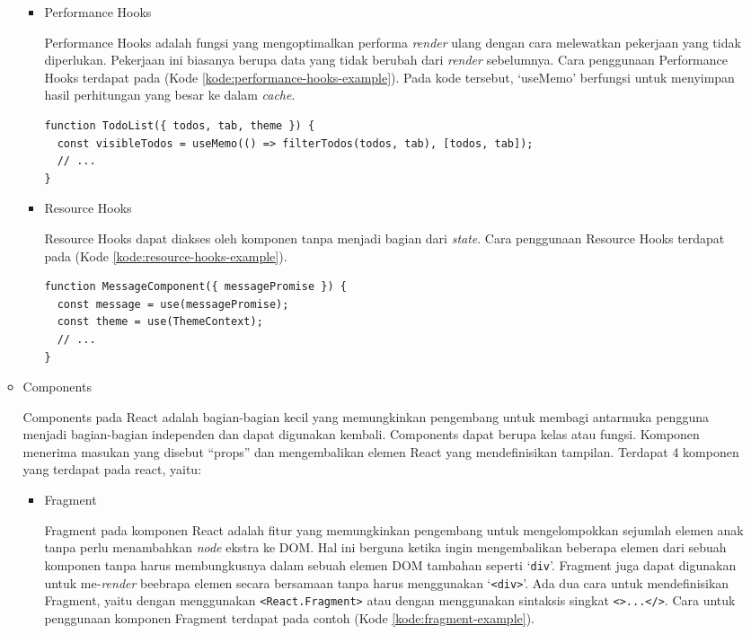\documentclass[a4paper,twoside]{article}
\begin{document}
\begin{enumerate}
\begin{itemize}
\begin{itemize}
        \item Performance Hooks

        Performance Hooks adalah fungsi yang mengoptimalkan performa \textit{render} ulang dengan cara melewatkan pekerjaan yang tidak diperlukan. Pekerjaan ini biasanya berupa data yang tidak berubah dari \textit{render} sebelumnya. Cara penggunaan Performance Hooks terdapat pada (Kode \ref{kode:performance-hooks-example}). Pada kode tersebut, `useMemo' berfungsi untuk menyimpan hasil perhitungan yang besar ke dalam \textit{cache}.

\begin{lstlisting}[language=HTML, caption=Contoh Potongan Kode Performance Hooks, label=kode:performance-hooks-example,breaklines=true]
function TodoList({ todos, tab, theme }) {
  const visibleTodos = useMemo(() => filterTodos(todos, tab), [todos, tab]);
  // ...
}
\end{lstlisting}

        \item Resource Hooks

        Resource Hooks dapat diakses oleh komponen tanpa menjadi bagian dari \textit{state}. Cara penggunaan Resource Hooks terdapat pada (Kode \ref{kode:resource-hooks-example}).

\begin{lstlisting}[language=HTML, caption=Contoh Potongan Kode Resource Hooks, label=kode:resource-hooks-example]
function MessageComponent({ messagePromise }) {
  const message = use(messagePromise);
  const theme = use(ThemeContext);
  // ...
}
\end{lstlisting}
    \end{itemize}

    \item Components

    Components pada React adalah bagian-bagian kecil yang memungkinkan pengembang untuk membagi antarmuka pengguna menjadi bagian-bagian independen dan dapat digunakan kembali. Components dapat berupa kelas atau fungsi. Komponen menerima masukan yang disebut ``props'' dan mengembalikan elemen React yang mendefinisikan tampilan. Terdapat 4 komponen yang terdapat pada react, yaitu:

    \begin{itemize}
        \item Fragment

        Fragment pada komponen React adalah fitur yang memungkinkan pengembang untuk mengelompokkan sejumlah elemen anak tanpa perlu menambahkan \textit{node} ekstra ke DOM. Hal ini berguna ketika ingin mengembalikan beberapa elemen dari sebuah komponen tanpa harus membungkusnya dalam sebuah elemen DOM tambahan seperti `\texttt{div}'. Fragment juga dapat digunakan untuk me-\textit{render} beebrapa elemen secara bersamaan tanpa harus menggunakan `\texttt{<div>}'. Ada dua cara untuk mendefinisikan Fragment, yaitu dengan menggunakan \texttt{<React.Fragment>} atau dengan menggunakan sintaksis singkat \texttt{<>...</>}. Cara untuk penggunaan komponen Fragment terdapat pada contoh (Kode \ref{kode:fragment-example}).


\end{itemize}
\end{itemize}
\end{enumerate}
\end{document}
